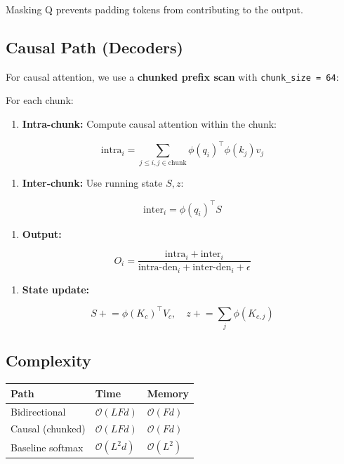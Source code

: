Masking Q prevents padding tokens from contributing to the output.

\subsection{Causal Path (Decoders)}

For causal attention, we use a \textbf{chunked prefix scan} with \texttt{chunk\_size = 64}:

For each chunk:

\begin{enumerate}
\item \textbf{Intra-chunk:} Compute causal attention within the chunk:

\end{enumerate}
\[
\text{intra}_i = \sum_{j \leq i, j \in \text{chunk}} \phi(q_i)^\top \phi(k_j) v_j
\tag{4.3}
\]

\begin{enumerate}
\item \textbf{Inter-chunk:} Use running state $S, z$:

\end{enumerate}
\[
\text{inter}_i = \phi(q_i)^\top S
\tag{4.4}
\]

\begin{enumerate}
\item \textbf{Output:}

\end{enumerate}
\[
O_i = \frac{\text{intra}_i + \text{inter}_i}{\text{intra-den}_i + \text{inter-den}_i + \epsilon}
\tag{4.5}
\]

\begin{enumerate}
\item \textbf{State update:}

\end{enumerate}
\[
S \mathrel{+}= \phi(K_c)^\top V_c, \quad z \mathrel{+}= \sum_j \phi(K_{c,j})
\tag{4.6}
\]

\subsection{Complexity}

\begin{table}[H]
\centering
\small
\begin{tabular}{lll}
\toprule
\textbf{Path} & \textbf{Time} & \textbf{Memory} \\
\midrule
Bidirectional & $\mathcal{O}(L F d)$ & $\mathcal{O}(F d)$ \\
Causal (chunked) & $\mathcal{O}(L F d)$ & $\mathcal{O}(F d)$ \\
Baseline softmax & $\mathcal{O}(L^2 d)$ & $\mathcal{O}(L^2)$ \\
\bottomrule
\end{tabular}
\end{table}

